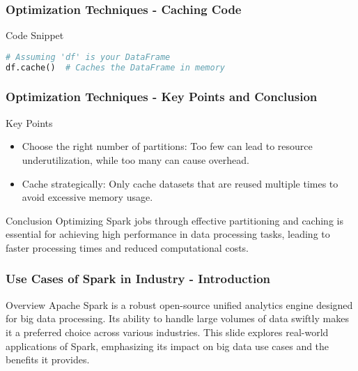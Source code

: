 \documentclass[aspectratio=169]{beamer}
\begin{document}
\begin{frame}[fragile]
    \frametitle{Optimization Techniques - Caching Code}
    \begin{block}{Code Snippet}
    \begin{lstlisting}[language=python]
# Assuming 'df' is your DataFrame
df.cache()  # Caches the DataFrame in memory
    \end{lstlisting}
    \end{block}
\end{frame}

\begin{frame}[fragile]
    \frametitle{Optimization Techniques - Key Points and Conclusion}
    \begin{block}{Key Points}
        \begin{itemize}
            \item Choose the right number of partitions: Too few can lead to resource underutilization, while too many can cause overhead.
            \item Cache strategically: Only cache datasets that are reused multiple times to avoid excessive memory usage.
        \end{itemize}
    \end{block}

    \begin{block}{Conclusion}
        Optimizing Spark jobs through effective partitioning and caching is essential for achieving high performance in data processing tasks, leading to faster processing times and reduced computational costs.
    \end{block}
\end{frame}

\begin{frame}[fragile]
    \frametitle{Use Cases of Spark in Industry - Introduction}
    \begin{block}{Overview}
        Apache Spark is a robust open-source unified analytics engine designed for big data processing. Its ability to handle large volumes of data swiftly makes it a preferred choice across various industries. This slide explores real-world applications of Spark, emphasizing its impact on big data use cases and the benefits it provides.
    \end{block}
\end{frame}
\end{document}
